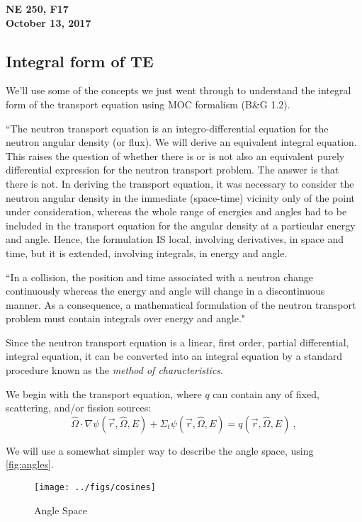 \documentclass[12pt]{article}
\newcommand{\rvec}{\ensuremath{\vec{r}}}
\newcommand{\vOmega}{\ensuremath{\hat{\Omega}}}
\begin{document}
\begin{center}
{\bf NE 250, F17\\
October 13, 2017 
}
\end{center}

\subsection*{Integral form of TE} 
We'll use some of the concepts we just went through to understand the integral form of the transport equation using MOC formalism (B\&G 1.2).

``The neutron transport equation is an integro-differential equation for the
neutron angular density (or flux). We will derive an equivalent integral equation. This raises the question of whether there is or is not also an
equivalent purely differential expression for the neutron transport problem.
The answer is that there is not. In deriving the transport
equation, it was necessary to consider the neutron angular density in the 
immediate (space-time) vicinity only of the point under consideration, whereas the
whole range of energies and angles had to be included in the transport equation
for the angular density at a particular energy and angle. Hence, the formulation
IS local, involving derivatives, in space and time, but it is extended, involving
integrals, in energy and angle.

``In a collision, the position
and time associated with a neutron change continuously whereas the energy and
angle will change in a discontinuous manner. As a consequence, a mathematical
formulation of the neutron transport problem must contain integrals over energy
and angle."

Since the neutron transport equation is a linear, first order, partial differential,
integral equation, it can be converted into an integral equation by a standard
procedure known as the \textit{method of characteristics}.

We begin with the transport equation, where $q$ can contain any of fixed, scattering, and/or fission sources:
\[\vOmega \cdot \nabla \psi(\rvec, \vOmega, E) + \Sigma_t \psi(\rvec, \vOmega, E) = q(\rvec, \vOmega, E)\:,\]

We will use a somewhat simpler way to describe the angle space, using \autoref{fig:angles}.
\begin{figure}[h!] 
    \label{fig:cosines}
    \begin{center}
    \texttt{[image: ../figs/cosines]}
    \end{center}    
    \caption{Angle Space}
    \label{fig:angles}
\end{figure}
\end{document}
